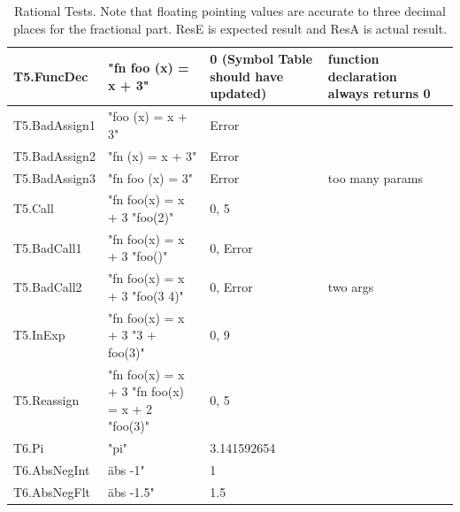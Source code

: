 \documentclass[a4paper, oneside, 11pt]{report}
\begin{document}
\begin{table}
\centering
\caption{Rational Tests. Note that floating pointing values are accurate to three decimal places for the fractional part. ResE is expected result and ResA is actual result. \\}
\label{Table2}
\begin{tabular}{|p{1.5in}|p{1.5in}|p{1.6in}|p{1.6in}|p{2.4in}|} 
\hline
T5.FuncDec     & "fn foo (x) = x + 3"                           & 0 (Symbol Table should have updated)     & function declaration always returns 0  \\ 
\hline
T5.BadAssign1  & "foo (x) = x + 3"                              & Error                                    &                                        \\ 
\hline
T5.BadAssign2  & "fn (x) = x + 3"                               & Error                                    &                                        \\ 
\hline
T5.BadAssign3  & "fn foo (x) = 3"                               & Error                                    & too many params                        \\ 
\hline
T5.Call        & "fn foo(x) = x + 3 "foo(2)"                    & 0, 5                                     &                                        \\ 
\hline
T5.BadCall1    & "fn foo(x) = x + 3 "foo()"                     & 0, Error                                 &                                        \\ 
\hline
T5.BadCall2    & "fn foo(x) = x + 3 "foo(3 4)"                  & 0, Error                                 & two args                               \\ 
\hline
T5.InExp       & "fn foo(x) = x + 3 "3 + foo(3)"                & 0, 9                                     &                                        \\ 
\hline
T5.Reassign    & "fn foo(x) = x + 3 "fn foo(x) = x + 2 "foo(3)" & 0, 5                                     &                                        \\ 
\hline
T6.Pi          & "pi"                                           & 3.141592654                              &                                        \\ 
\hline
T6.AbsNegInt   & äbs -1"                                        & 1                                        &                                        \\ 
\hline
T6.AbsNegFlt   & äbs -1.5"                                      & 1.5                                      &                                        \\ 

\end{tabular}
\end{table}
\end{document}
